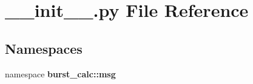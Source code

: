 \section{\-\_\-\-\_\-init\-\_\-\-\_\-.\-py \-File \-Reference}
\label{msg_2____init_____8py}
\subsection*{\-Namespaces}
\begin{DoxyCompactItemize}
\item 
namespace {\bf burst\-\_\-calc\-::msg}
\end{DoxyCompactItemize}

